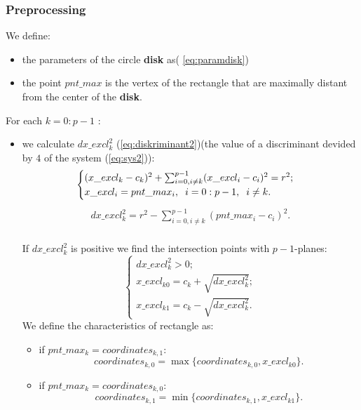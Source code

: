 \documentclass{report}
\begin{document}
	\subsubsection*{Preprocessing}
	We define:
	\begin{itemize}
		\item the parameters of the circle {\bfseries disk} as( \ref{eq:paramdisk})    
		\item  the point $pnt\_max$ is the vertex of the rectangle that are  maximally distant from the center of the {\bfseries disk}.
	\end{itemize}
	For each $k = 0:p-1$ :
	\begin{itemize}
		\item  we calculate $dx\_excl_k^2$ (\ref{eq:diskriminant2})(the value of a discriminant devided by  $4$ of the system (\ref{eq:sys2})):
		\begin{equation}
			\begin{cases}
				(x\_excl_k - c_k)^2 + \sum_{i=0, i \neq k}^{p-1} (x\_excl_i - c_i)^2 = r^2;\\ 
				x\_excl_i = pnt\_max_i,\hspace*{2mm} i = 0:p-1, \hspace*{2mm}i \neq k.
			\end{cases}
			\label{eq:sys2}
		\end{equation}
		\begin{equation}
			\begin{gathered}
				dx\_excl_k^2 = r^2 - \sum_{i=0, i \neq k}^{p-1} (pnt\_max_i - c_i)^2.\\
				\label{eq:diskriminant2}
			\end{gathered}
		\end{equation}
		
		If $dx\_excl_k^2$ is positive we find the intersection points with $p-1$-planes:
		\begin{equation}
			\begin{cases}
				dx\_excl_k^2 > 0;\\ 
				x\_excl_{k0} = c_k + \sqrt {dx\_excl_k^2};\\
				x\_excl_{k1} = c_k - \sqrt {dx\_excl_k^2}.
				\label{eq:l1l2}
			\end{cases}
		\end{equation}
		We define the characteristics of rectangle as:
		\begin{itemize}
			\item if $pnt\_max_k = coordinates_{k,1}$:	
			\begin{equation}
				coordinates_{k,0} = \max\{coordinates_{k,0}, x\_excl_{k0}\}.
				\label{eq:cond1}
			\end{equation}
			\item if $pnt\_max_k = coordinates_{k,0}$:	
			\begin{equation}
				coordinates_{k,1} = \min\{coordinates_{k,1}, x\_excl_{k1}\}. 
				\label{eq:cond2}
			\end{equation}	
		\end{itemize}
	\end{itemize}
\end{document}
